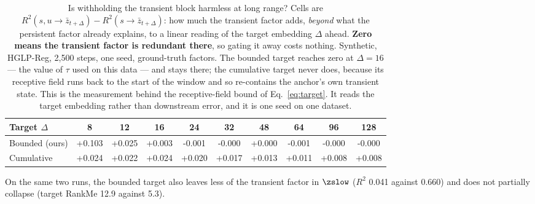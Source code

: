 \begin{table}[!tb]
\caption{Is withholding the transient block harmless at long range? Cells are
$R^2(s,u\!\to\!\bar z_{t+\Delta}) - R^2(s\!\to\!\bar z_{t+\Delta})$: how much the
transient factor adds, \emph{beyond} what the persistent factor already explains, to a
linear reading of the target embedding $\Delta$ ahead. \textbf{Zero means the transient
factor is redundant there}, so gating it away costs nothing. Synthetic, HGLP-Reg, 2{,}500
steps, one seed, ground-truth factors. The bounded target reaches zero at
$\Delta=16$ --- the value of $\tau$ used on this data --- and stays there; the cumulative
target never does, because its receptive field runs back to the start of the window and so
re-contains the anchor's own transient state. This is the measurement behind the
receptive-field bound of Eq.~\ref{eq:target}. It reads the target embedding rather than
downstream error, and it is one seed on one dataset.}
\label{tab:targetpilot}
\centering
\small
\begin{tabular}{lccccccccc}
\hline
Target $\Delta$ & 8 & 12 & 16 & 24 & 32 & 48 & 64 & 96 & 128 \\
\hline
Bounded (ours) & +0.103 & +0.025 & +0.003 & -0.001 & -0.000 & +0.000 & -0.001 & -0.000 & -0.000 \\
Cumulative & +0.024 & +0.022 & +0.024 & +0.020 & +0.017 & +0.013 & +0.011 & +0.008 & +0.008 \\
\hline
\end{tabular}

\medskip
\small On the same two runs, the bounded target also leaves less of the transient factor
in $\zslow$ ($R^2$ 0.041 against 0.660) and does not partially
collapse (target RankMe 12.9 against 5.3).
\end{table}
